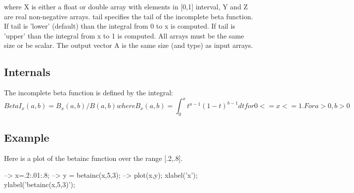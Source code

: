  where {\ttfamily X} is either a {\ttfamily float} or {\ttfamily double} array with elements in \mbox{[}0,1\mbox{]} interval, {\ttfamily Y} and {\ttfamily Z} are real non-\/negative arrays. {\ttfamily tail} specifies the tail of the incomplete beta function. If {\ttfamily tail} is 'lower' (default) than the integral from 0 to x is computed. If {\ttfamily tail} is 'upper' than the integral from x to 1 is computed. All arrays must be the same size or be scalar. The output vector {\ttfamily A} is the same size (and type) as input arrays. \hypertarget{transforms_svd_Function}{}\subsection{Internals}\label{transforms_svd_Function}
The incomplete beta function is defined by the integral\-: \[ BetaI_x(a,b)=B_x(a,b)/B(a,b) where B_x(a,b) = \int_0^x t^{a-1} (1-t)^{b-1} dt for 0 <= x <= 1. For a > 0, b > 0 \] \hypertarget{variables_struct_Example}{}\subsection{Example}\label{variables_struct_Example}
Here is a plot of the betainc function over the range {\ttfamily \mbox{[}.2,.8\mbox{]}}.


\begin{DoxyVerbInclude}
--> x=.2:.01:.8;
--> y = betainc(x,5,3);
--> plot(x,y); xlabel('x'); ylabel('betainc(x,5,3)');
\end{DoxyVerbInclude}


